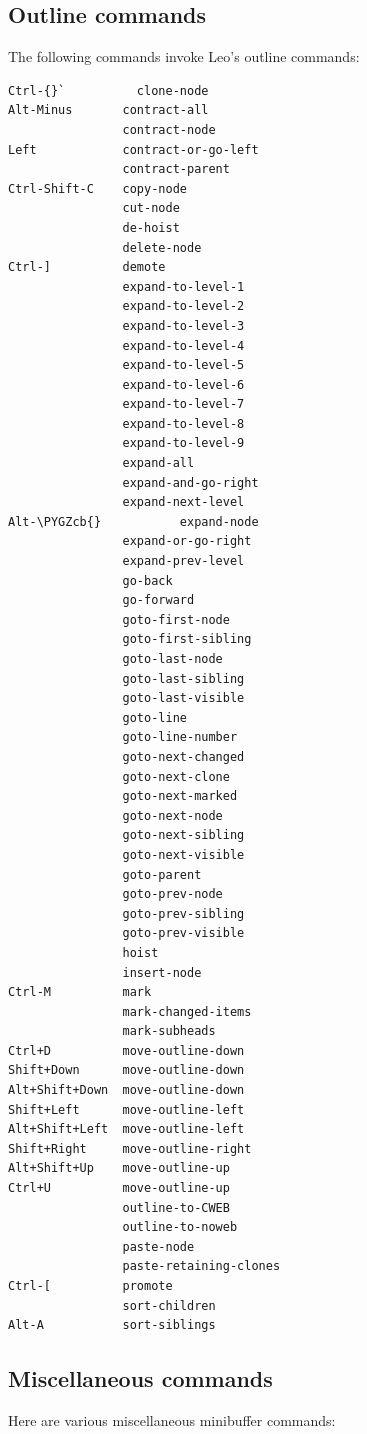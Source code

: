 \documentclass[a4paper,10pt,english]{sphinxmanual}
\def\PYGZcb{\char`\}}
\begin{document}
\subsection{Outline commands}
\label{commands:outline-commands}
The following commands invoke Leo's outline commands:

\begin{Verbatim}[commandchars=\\\{\}]
Ctrl-{}`          clone-node
Alt-Minus       contract-all
                contract-node
Left            contract-or-go-left
                contract-parent
Ctrl-Shift-C    copy-node
                cut-node
                de-hoist
                delete-node
Ctrl-]          demote
                expand-to-level-1
                expand-to-level-2
                expand-to-level-3
                expand-to-level-4
                expand-to-level-5
                expand-to-level-6
                expand-to-level-7
                expand-to-level-8
                expand-to-level-9
                expand-all
                expand-and-go-right
                expand-next-level
Alt-\PYGZcb{}           expand-node
                expand-or-go-right
                expand-prev-level
                go-back
                go-forward
                goto-first-node
                goto-first-sibling
                goto-last-node
                goto-last-sibling
                goto-last-visible
                goto-line
                goto-line-number
                goto-next-changed
                goto-next-clone
                goto-next-marked
                goto-next-node
                goto-next-sibling
                goto-next-visible
                goto-parent
                goto-prev-node
                goto-prev-sibling
                goto-prev-visible
                hoist
                insert-node
Ctrl-M          mark
                mark-changed-items
                mark-subheads
Ctrl+D          move-outline-down
Shift+Down      move-outline-down
Alt+Shift+Down  move-outline-down
Shift+Left      move-outline-left
Alt+Shift+Left  move-outline-left
Shift+Right     move-outline-right
Alt+Shift+Up    move-outline-up
Ctrl+U          move-outline-up
                outline-to-CWEB
                outline-to-noweb
                paste-node
                paste-retaining-clones
Ctrl-[          promote
                sort-children
Alt-A           sort-siblings
\end{Verbatim}


\subsection{Miscellaneous commands}
\label{commands:miscellaneous-commands}
Here are various miscellaneous minibuffer commands:
\end{document}
